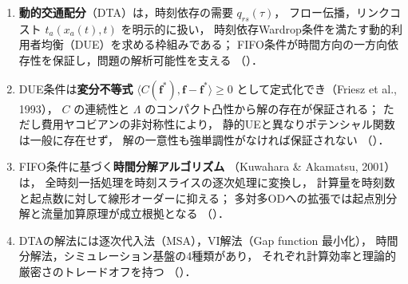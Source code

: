 \begin{enumerate}
  \item \textbf{動的交通配分}（DTA）は，時刻依存の需要 $q_{rs}(\tau)$，
        フロー伝播，リンクコスト $t_a(x_a(t),t)$ を明示的に扱い，
        時刻依存Wardrop条件を満たす動的利用者均衡（DUE）を求める枠組みである；
        FIFO条件が時間方向の一方向依存性を保証し，問題の解析可能性を支える
        （）．
  \item DUE条件は\textbf{変分不等式}
        $\langle C(\boldsymbol{f}^*), \boldsymbol{f} - \boldsymbol{f}^* \rangle \geq 0$
        として定式化でき（Friesz et al., 1993），
        $C$ の連続性と $\Lambda$ のコンパクト凸性から解の存在が保証される；
        ただし費用ヤコビアンの非対称性により，
        静的UEと異なりポテンシャル関数は一般に存在せず，
        解の一意性も強単調性がなければ保証されない
        （）．
  \item FIFO条件に基づく\textbf{時間分解アルゴリズム}
        （Kuwahara \& Akamatsu, 2001）は，
        全時刻一括処理を時刻スライスの逐次処理に変換し，
        計算量を時刻数と起点数に対して線形オーダーに抑える；
        多対多ODへの拡張では起点別分解と流量加算原理が成立根拠となる
        （）．
  \item DTAの解法には逐次代入法（MSA），VI解法（Gap function 最小化），
        時間分解法，シミュレーション基盤の4種類があり，
        それぞれ計算効率と理論的厳密さのトレードオフを持つ
        （）．
\end{enumerate}
